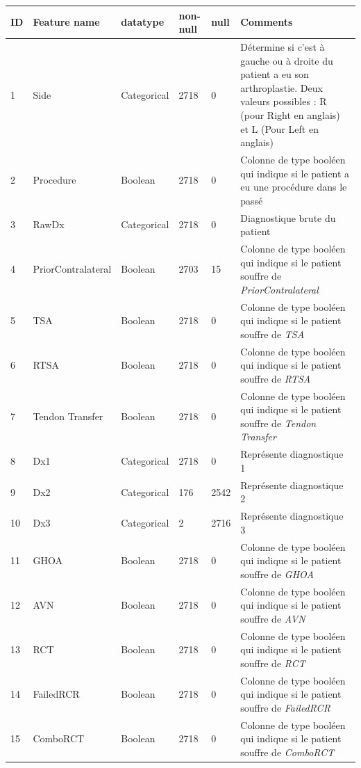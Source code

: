 \documentclass[12pt, french]{report}
\begin{document}
\begin{longtable}{| p{} | p{} | p{} | p{}  | p{} | p{} |  } 
\hline
\textbf{ID} & \textbf{Feature name} & \textbf{datatype} & \textbf{non-null }& \textbf{ null } & \textbf{Comments}\\ \hline

1 &	Side & Categorical & 2718 & 0 & Détermine si c'est à gauche ou à droite du patient a eu son arthroplastie. Deux valeurs possibles : R (pour Right en anglais) et  L (Pour Left en anglais) \\ \hline 
2 &	Procedure & Boolean & 2718 & 0& Colonne de type booléen qui indique si le patient  a eu une procédure dans le passé \\ \hline 
3 &	RawDx & Categorical & 2718 & 0 & Diagnostique brute du patient  \\ \hline 
4 &	PriorContralateral & Boolean & 2703 & 15& Colonne de type booléen qui indique si le patient souffre  de \textit{PriorContralateral} \\ \hline 
5 &	TSA & Boolean & 2718 & 0& Colonne de type booléen qui indique si le patient souffre  de \textit{TSA} \\ \hline 
6 &	RTSA & Boolean & 2718 & 0& Colonne de type booléen qui indique si le patient souffre  de \textit{RTSA} \\ \hline 
7 &	Tendon Transfer & Boolean & 2718 & 0& Colonne de type booléen qui indique si le patient souffre  de \textit{Tendon Transfer} \\ \hline 
8 &	Dx1 & Categorical & 2718 & 0 & Représente diagnostique 1 \\ \hline 
9 &	Dx2 & Categorical & 176 & 2542 & Représente diagnostique 2 \\ \hline 
10 &	Dx3 & Categorical & 2 & 2716 & Représente diagnostique 3 \\ \hline 
11 &	GHOA & Boolean & 2718 & 0& Colonne de type booléen qui indique si le patient souffre  de \textit{GHOA} \\ \hline 
12 &	AVN & Boolean & 2718 & 0& Colonne de type booléen qui indique si le patient souffre  de \textit{AVN} \\ \hline 
13 &	RCT & Boolean & 2718 & 0& Colonne de type booléen qui indique si le patient souffre  de \textit{RCT} \\ \hline 
14 &	FailedRCR & Boolean & 2718 & 0& Colonne de type booléen qui indique si le patient souffre  de \textit{FailedRCR} \\ \hline 
15 &	ComboRCT & Boolean & 2718 & 0& Colonne de type booléen qui indique si le patient souffre  de \textit{ComboRCT} \\ \hline 

\end{longtable}
\end{document}
